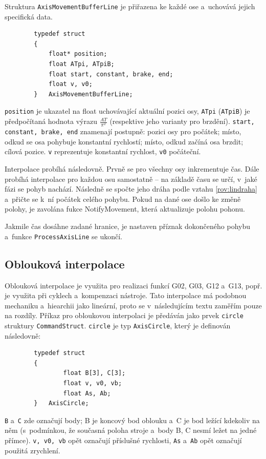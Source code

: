 		Struktura {\tt AxisMovementBufferLine} je přiřazena ke každé ose a~uchovává jejich specifická data.
		\begin{verbatim}
		typedef struct
		{
		    float* position;
		    float ATpi, ATpiB;
		    float start, constant, brake, end;
		    float v, v0;
		}	AxisMovementBufferLine;
		\end{verbatim}
		{\tt position} je ukazatel na float uchovávající aktuální pozici osy, {\tt ATpi} ({\tt ATpiB}) je předpočítaná hodnota výrazu $\frac{AT}{\pi^2}$ (respektive jeho varianty pro brzdění). {\tt start, constant, brake, end} znamenají postupně: pozici osy pro počátek; místo, odkud se osa pohybuje konstantní rychlostí; místo, odkud začíná osa brzdit; cílová pozice. {\tt v} reprezentuje konstantní rychlost, {\tt v0} počáteční.
		
		Interpolace probíhá následovně. Prvně se pro všechny osy inkrementuje čas. Dále probíhá interpolace pro každou osu samostatně -- na základě času se určí, v~jaké fázi se pohyb nachází. Následně se spočte jeho dráha podle vztahu \ref{rov:lindraha} a~přičte se k~ní počátek celého pohybu. Pokud na dané ose došlo ke změně polohy, je zavolána fukce NotifyMovement, která aktualizuje polohu pohonu.
		
		Jakmile čas dosáhne zadané hranice, je nastaven příznak dokončeného pohybu a~funkce {\tt ProcessAxisLine} se ukončí.
		
		\subsection{Oblouková interpolace}\label{kap:oblinter}
		
		Oblouková interpolace je využita pro realizaci funkcí G02, G03, G12 a~G13\cite{gcode}, popř. je využita při cyklech a~kompenzaci nástroje. Tato interpolace má podobnou mechaniku a~hiearchii jako lineární, proto se v~následujícím textu zaměřím pouze na rozdíly.
		Příkaz pro obloukovou interpolaci je předáván jako prvek {\tt circle} struktury {\tt CommandStruct}. {\tt circle} je typ {\tt AxisCircle}, který je definován následovně:
		\begin{verbatim}
		typedef struct
		{
			    float B[3], C[3];
			    float v, v0, vb;
			    float As, Ab;
		}	AxisCircle;
		\end{verbatim}
		{\tt B} a~{\tt C} zde označují body; B je koncový bod oblouku a~C je bod ležící kdekoliv na něm (s~podmínkou, že současná poloha stroje a~body B, C nesmí ležet na jedné přímce). {\tt v, v0, vb} opět označují příslušné rychlosti, {\tt As} a~{\tt Ab} opět označují použitá zrychlení.
		
